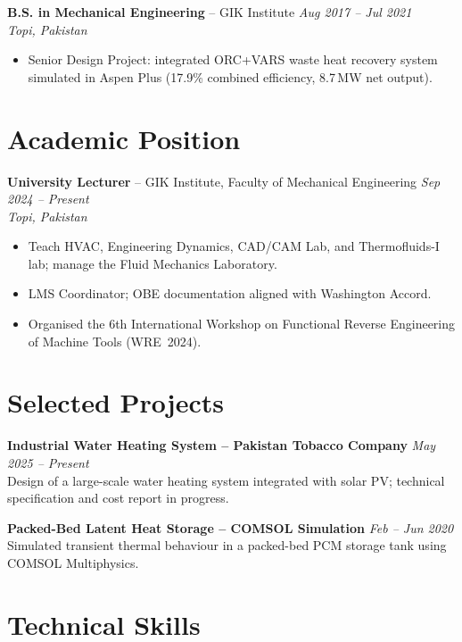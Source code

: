 \documentclass[11pt,a4paper]{article}
\begin{document}
\vspace{4pt}
\textbf{B.S. in Mechanical Engineering} -- GIK Institute
\hfill \textit{Aug 2017 -- Jul 2021}\\
\textit{Topi, Pakistan}
\begin{itemize}
  \item Senior Design Project: integrated ORC+VARS waste heat recovery system
        simulated in Aspen Plus (17.9\% combined efficiency, 8.7\,MW net output).
\end{itemize}

\section{Academic Position}

\textbf{University Lecturer} -- GIK Institute, Faculty of Mechanical Engineering
\hfill \textit{Sep 2024 -- Present}\\
\textit{Topi, Pakistan}
\begin{itemize}
  \item Teach HVAC, Engineering Dynamics, CAD/CAM Lab, and Thermofluids-I lab;
        manage the Fluid Mechanics Laboratory.
  \item LMS Coordinator; OBE documentation aligned with Washington Accord.
  \item Organised the 6th International Workshop on Functional Reverse Engineering
        of Machine Tools (WRE~2024).
\end{itemize}

\section{Selected Projects}

\textbf{Industrial Water Heating System -- Pakistan Tobacco Company}
\hfill \textit{May 2025 -- Present}\\
Design of a large-scale water heating system integrated with solar PV; technical
specification and cost report in progress.

\vspace{4pt}
\textbf{Packed-Bed Latent Heat Storage -- COMSOL Simulation}
\hfill \textit{Feb -- Jun 2020}\\
Simulated transient thermal behaviour in a packed-bed PCM storage tank using
COMSOL Multiphysics.

\section{Technical Skills}
\end{document}
